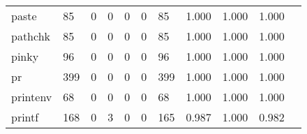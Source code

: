\begin{longtable}{lp{1.2cm}p{1.2cm}p{1.2cm}p{1.2cm}p{1.2cm}p{1.2cm}p{1.2cm}p{1.2cm}p{1.2cm}p{1.2cm}}
paste     &                                    85 &                                                  0 &                                                  0 &                                                  0 &                                                  0 &                                                 85 &                                         1.000 &                                              1.000 &                                              1.000 \\
pathchk   &                                    85 &                                                  0 &                                                  0 &                                                  0 &                                                  0 &                                                 85 &                                         1.000 &                                              1.000 &                                              1.000 \\
pinky     &                                    96 &                                                  0 &                                                  0 &                                                  0 &                                                  0 &                                                 96 &                                         1.000 &                                              1.000 &                                              1.000 \\
pr        &                                   399 &                                                  0 &                                                  0 &                                                  0 &                                                  0 &                                                399 &                                         1.000 &                                              1.000 &                                              1.000 \\
printenv  &                                    68 &                                                  0 &                                                  0 &                                                  0 &                                                  0 &                                                 68 &                                         1.000 &                                              1.000 &                                              1.000 \\
printf    &                                   168 &                                                  0 &                                                  3 &                                                  0 &                                                  0 &                                                165 &                                         0.987 &                                              1.000 &                                              0.982 \\

\end{longtable}
